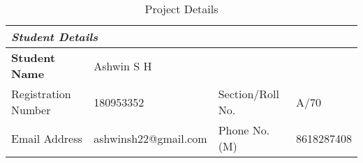 
\begin{table}
\begin{scriptsize}
\caption{Project Details}
\begin{tabularx}{\textwidth}{|p{2cm}|p{3cm}|p{2cm}|p{2cm}|}
\multicolumn{4}{l}{\textit{Student Details}}\\ 
\hline
\textbf{Student Name}&\multicolumn{2}{X}{Ashwin S H}&\\ \hline

Registration Number&180953352&Section/Roll No.& A/70\\ \hline

Email Address&\tiny{ashwinsh22@gmail.com}&Phone No.(M)&8618287408 \\  \hline


\end{tabularx}
\end{scriptsize}
\end{table}
